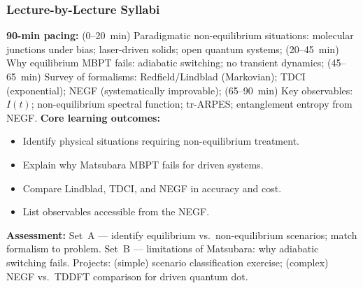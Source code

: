 \documentclass[11pt,a4paper]{article}
\begin{document}
\subsubsection*{Lecture-by-Lecture Syllabi}

\begin{tcolorbox}[modulebox, title={Module~II.5 --- Lecture L01: Motivation and Scope of NEGF}]
\textbf{90-min pacing:} (0--20~min) Paradigmatic non-equilibrium situations: molecular junctions under bias; laser-driven solids; open quantum systems; (20--45~min) Why equilibrium MBPT fails: adiabatic switching; no transient dynamics; (45--65~min) Survey of formalisms: Redfield/Lindblad (Markovian); TDCI (exponential); NEGF (systematically improvable); (65--90~min) Key observables: $I(t)$; non-equilibrium spectral function; tr-ARPES; entanglement entropy from NEGF.
\medskip\textbf{Core learning outcomes:}
\begin{itemize}[leftmargin=1.4em,topsep=2pt,itemsep=1pt]
  \item Identify physical situations requiring non-equilibrium treatment.
  \item Explain why Matsubara MBPT fails for driven systems.
  \item Compare Lindblad, TDCI, and NEGF in accuracy and cost.
  \item List observables accessible from the NEGF.
\end{itemize}
\medskip\textbf{Assessment:}
Set~A --- identify equilibrium vs.\ non-equilibrium scenarios; match formalism to problem.
Set~B --- limitations of Matsubara: why adiabatic switching fails.
Projects: (simple) scenario classification exercise; (complex) NEGF vs.\ TDDFT comparison for driven quantum dot.
\end{tcolorbox}

\medskip
\end{document}
